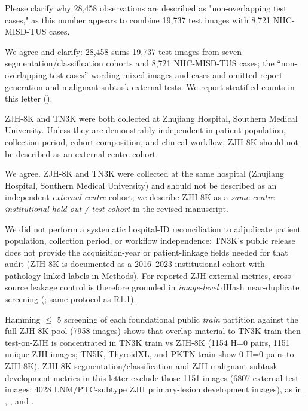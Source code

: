 \begin{reviewercomment}
Please clarify why 28,458 observations are described as "non-overlapping test cases," as this number appears to combine 19,737 test images with 8,721 NHC-MISD-TUS cases.
\end{reviewercomment}
\begin{authorresponse}
We agree and clarify: 28,458 sums 19,737 test images from seven segmentation/classification cohorts and 8,721 NHC-MISD-TUS cases; the ``non-overlapping test cases'' wording mixed images and cases and omitted report-generation and malignant-subtask external tests. We report stratified counts in this letter ().\par
\par
\end{authorresponse}

\begin{reviewercomment}
ZJH-8K and TN3K were both collected at Zhujiang Hospital, Southern Medical University. Unless they are demonstrably independent in patient population, collection period, cohort composition, and clinical workflow, ZJH-8K should not be described as an external-centre cohort.
\end{reviewercomment}
\begin{authorresponse}
We agree. ZJH-8K and TN3K were collected at the same hospital (Zhujiang Hospital, Southern Medical University) and should not be described as an independent \emph{external centre} cohort; we describe ZJH-8K as a \emph{same-centre institutional hold-out / test cohort} in the revised manuscript.\par
We did not perform a systematic hospital-ID reconciliation to adjudicate patient population, collection period, or workflow independence: TN3K's public release does not provide the acquisition-year or patient-linkage fields needed for that audit (ZJH-8K is documented as a 2016--2023 institutional cohort with pathology-linked labels in Methods). For reported ZJH external metrics, cross-source leakage control is therefore grounded in \emph{image-level} dHash near-duplicate screening (; same protocol as R1.1).\par
Hamming $\leq$ 5 screening of each foundational public \emph{train} partition against the full ZJH-8K pool (7958 images) shows that overlap material to TN3K-train-then-test-on-ZJH is concentrated in TN3K train vs ZJH-8K (1154 H=0 pairs, 1151 unique ZJH images; TN5K, ThyroidXL, and PKTN train show 0 H=0 pairs to ZJH-8K). ZJH-8K segmentation/classification and ZJH malignant-subtask development metrics in this letter exclude those 1151 images (6807 external-test images; 4028 LNM/PTC-subtype ZJH primary-lesion development images), as in , , and .\par
\par
\end{authorresponse}

